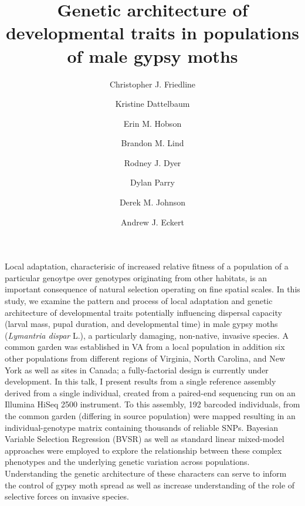 \documentclass{article}
\date{}
\title{Genetic architecture of developmental traits in populations of male gypsy moths}
\author[1]{Christopher J. Friedline}
\author[1,2]{Kristine Dattelbaum}
\author[1]{Erin M. Hobson}
\author[1]{Brandon M. Lind}
\author[1]{Rodney J. Dyer}
\author[3]{Dylan Parry}
\author[1]{Derek M. Johnson}
\author[1]{Andrew J. Eckert}
\affil[1]{Department of Biology, Virginia Commonwealth University}
\affil[2]{Deparment of Biology, University of Richmond}
\affil[3]{College of Environmental Science \& Forestry, State University of New 
York}
\begin{document}
\maketitle

\label{sec:abstract}

Local adaptation, characterisic of increased relative fitness
of a population of a particular genoytpe over genotypes originating from
other habitats, is an important consequence of natural selection
operating on fine spatial scales.  In this study, we examine the
pattern and process of local adaptation and genetic architecture of
developmental traits potentially influencing dispersal capacity
(larval mass, pupal duration, and developmental time) in male gypsy
moths (\textit{Lymantria dispar} L.), a particularly damaging,
non-native, invasive species.  A common garden was established in VA
from a local population in addition six other populations from
different regions of Virginia, North Carolina, and New York as well as
sites in Canada; a fully-factorial design is currently under
development.  In this talk, I present results from a single reference
assembly derived from a single individual, created from a paired-end
sequencing run on an Illumina HiSeq 2500 instrument.  To this
assembly, 192 barcoded individuals, from the common garden (differing
in source population) were mapped resulting in an individual-genotype
matrix containing thousands of reliable SNPs.  Bayesian Variable
Selection Regression (BVSR) as well as standard linear mixed-model
approaches were employed to explore the relationship between these
complex phenotypes and the underlying genetic variation across
populations. Understanding the genetic architecture of these
characters can serve to inform the control of gypsy moth spread as
well as increase understanding of the role of selective forces on
invasive species.
\end{document}
